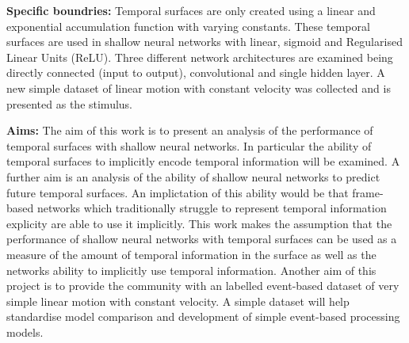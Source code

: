 \textbf{Specific boundries:}
Temporal surfaces are only created using a linear and exponential accumulation function with varying constants.
These temporal surfaces are used in shallow neural networks with linear, sigmoid and Regularised Linear Units (ReLU). 
Three different network architectures are examined being directly connected (input to output), convolutional and single hidden layer. 
A new simple dataset of linear motion with constant velocity was collected and is presented as the stimulus. 

\textbf{Aims:}
The aim of this work is to present an analysis of the performance of temporal surfaces with shallow neural networks.
In particular the ability of temporal surfaces to implicitly encode temporal information will be examined. 
A further aim is an analysis of the ability of shallow neural networks to predict future temporal surfaces.
An implictation of this ability would be that frame-based networks which traditionally struggle to represent temporal information explicity are able to use it implicitly. 
This work makes the assumption that the performance of shallow neural networks with temporal surfaces can be used as a measure of the amount of temporal information in the surface as well as the networks ability to implicitly use temporal information. 
Another aim of this project is to provide the community with an labelled event-based dataset of very simple linear motion with constant velocity. 
A simple dataset will help standardise model comparison and development of simple event-based processing models. 


